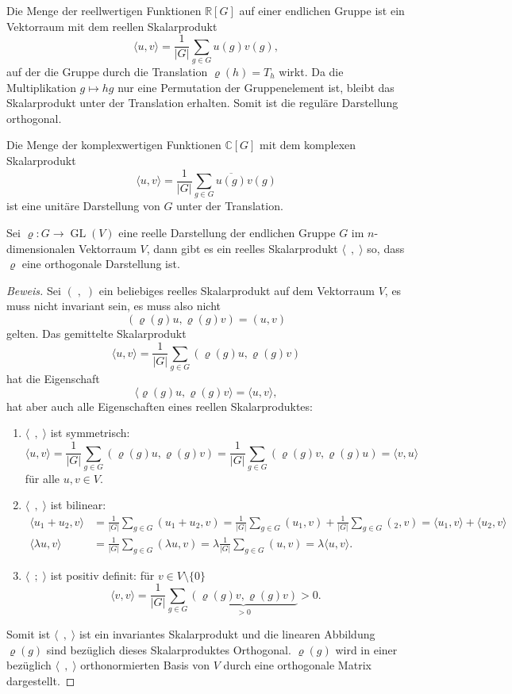 \begin{beispiel}
Die Menge der reellwertigen Funktionen $\mathbb{R}[G]$ auf einer endlichen
Gruppe ist ein Vektorraum mit dem reellen Skalarprodukt
\[
\langle u,v\rangle
=
\frac{1}{|G|}
\sum_{g\in G} u(g)v(g),
\]
auf der die Gruppe durch die Translation $\varrho(h)=T_h$ wirkt.
Da die Multiplikation $g\mapsto hg$ nur eine Permutation der Gruppenelement
ist, bleibt das Skalarprodukt unter der Translation erhalten.
Somit ist die reguläre Darstellung orthogonal.

Die Menge der komplexwertigen Funktionen $\mathbb{C}[G]$ mit dem
komplexen Skalarprodukt 
\[
\langle u,v\rangle
=
\frac{1}{|G|}
\sum_{g\in G} \overline{u(g)} v(g)
\]
ist eine unitäre Darstellung von $G$ unter der Translation.
\end{beispiel}

\begin{satz}
Sei $\varrho\colon G\to\operatorname{GL}(V)$ eine reelle Darstellung
der endlichen Gruppe $G$ im $n$-dimensionalen Vektorraum $V$, dann gibt
es ein reelles Skalarprodukt $\langle \;\,,\;\rangle$ so, dass
$\varrho$ eine orthogonale Darstellung ist.
\end{satz}

\begin{proof}[Beweis]
Sei $(\;,\;)$ ein beliebiges reelles Skalarprodukt auf dem Vektorraum $V$,
es muss nicht invariant sein, es muss also nicht
\[
(\varrho(g)u,\varrho(g)v)
=
(u,v)
\]
gelten.
Das gemittelte Skalarprodukt
\[
\langle u,v\rangle
=
\frac{1}{|G|}
\sum_{g\in G}
(\varrho(g)u,\varrho(g)v)
\]
hat die Eigenschaft
\[
\langle \varrho(g)u,\varrho(g)v\rangle
=
\langle u,v\rangle,
\]
hat aber auch alle Eigenschaften eines reellen Skalarproduktes:
\begin{enumerate}
\item $\langle\;\,,\;\rangle$ ist symmetrisch:
\[
\langle u,v\rangle
=
\frac{1}{|G|} \sum_{g\in G} (\varrho(g)u,\varrho(g)v)
=
\frac{1}{|G|} \sum_{g\in G} (\varrho(g)v,\varrho(g)u)
=
\langle v,u\rangle
\]
für alle $u,v\in V$.
\item $\langle\;\,,\;\rangle$ ist bilinear:
\begin{align*}
\langle u_1+u_2,v\rangle
&=
\frac{1}{|G|} \sum_{g\in G} (u_1+u_2,v)
=
\frac{1}{|G|} \sum_{g\in G} (u_1,v)
+
\frac{1}{|G|} \sum_{g\in G} (_2,v)
=
\langle u_1,v\rangle + \langle u_2,v\rangle
\\
\langle \lambda u,v\rangle
&=
\frac{1}{|G|} \sum_{g\in G} (\lambda u,v)
=
\lambda
\frac{1}{|G|} \sum_{g\in G} (u,v)
=
\lambda \langle u,v\rangle.
\end{align*}
\item $\langle \;\,;\;\rangle$ ist positiv definit: für $v\in V\setminus\{0\}$
\[
\langle v,v\rangle
=
\frac{1}{|G|} \sum_{g\in G}
\underbrace{(\varrho(g)v,\varrho(g)v)}_{\displaystyle > 0}
>
0.
\]
\end{enumerate}
Somit ist $\langle\;\,,\;\rangle$ ist ein invariantes Skalarprodukt und
die linearen Abbildung $\varrho(g)$ sind bezüglich dieses Skalarproduktes
Orthogonal.
$\varrho(g)$ wird in einer bezüglich $\langle\;\,,\;\rangle$
orthonormierten Basis von $V$ durch eine orthogonale Matrix dargestellt.
\end{proof}


